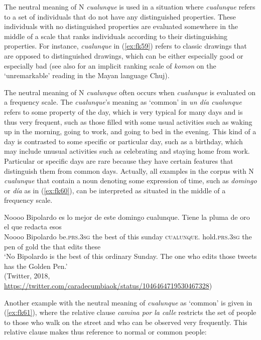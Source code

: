 \documentclass[output=paper,colorlinks,citecolor=brown]{langscibook}
\begin{document}
The neutral meaning of N \textit{cualunque} is used in a situation where \textit{cualunque} refers to a set of individuals that do not have any distinguished properties. These individuals with no distinguished properties are evaluated somewhere in the middle of a scale that ranks individuals according to their distinguishing properties. For instance, \textit{cualunque} in (\ref{ex:fk59}) refers to classic drawings that are opposed to distinguished drawings, which can be either especially good or especially bad (see also \citet{Alonso-OvalleRoyer2021} for an implicit ranking scale of \textit{komon} on the ‘unremarkable’ reading in the Mayan language Chuj).

The neutral meaning of N \textit{cualunque} often occurs when \textit{cualunque} is evaluated on a frequency scale. The \textit{cualunque}’s meaning as ‘common’ in \textit{un día cualunque} refers to some property of the day, which is very typical for many days and is thus very frequent, such as those filled with some usual activities such as waking up in the morning, going to work, and going to bed in the evening. This kind of a day is contrasted to some specific or particular day, such as a birthday, which may include unusual activities such as celebrating and staying home from work. Particular or specific days are rare because they have certain features that distinguish them from common days.
Actually, all examples in the corpus with N \textit{cualunque} that contain a noun denoting some expression of time, such as \textit{domingo} or \textit{día} as in (\ref{ex:fk60}), can be interpreted as situated in the middle of a frequency scale.

\ea \label{ex:fk60}
    \gll Noooo Bipolardo es lo mejor de este domingo cualunque. Tiene la pluma de oro el que redacta esos\\
    Noooo Bipolardo be.\textsc{prs.3sg} the best of this sunday \textsc{cualunque}. hold.\textsc{prs.3sg} the pen of gold the that edits these\\
   \glt ‘No Bipolardo is the best of this ordinary Sunday. The one who edits those tweets has the Golden Pen.’\\
    (Twitter, 2018, \url{https://twitter.com/caradecumbiaok/status/1046464719530467328})\\
\z

Another example with the neutral meaning of \textit{cualunque} as ‘common’ is given in (\ref{ex:fk61}), where the relative clause \textit{camina por la calle} restricts the set of people to those who walk on the street and who can be observed very frequently. This relative clause makes thus reference to normal or common people:
\end{document}
